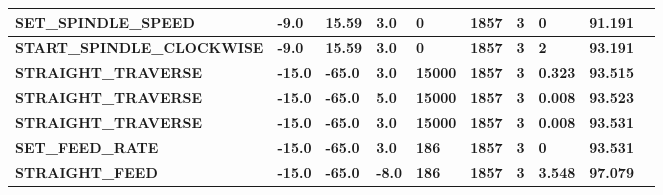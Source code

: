 \documentclass[aspectratio=169]{beamer}
\begin{document}
{\begin{frame}[fragile]
\begin{tabular}{|l|l|l|l|l|l|l|l|l|l|}
    \tiny{\bfseries{SET\_SPINDLE\_SPEED}} & 
    \tiny{\bfseries{-9.0}} & 
    \tiny{\bfseries{15.59}} & 
    \tiny{\bfseries{3.0}} & 
    \tiny{\bfseries{0}} & 
    \tiny{\bfseries{1857}} & 
    \tiny{\bfseries{3}} & 
    \tiny{\bfseries{0}} & 
    \tiny{\bfseries{91.191}} \\
    \hline

    \tiny{\bfseries{START\_SPINDLE\_CLOCKWISE}} & 
    \tiny{\bfseries{-9.0}} & 
    \tiny{\bfseries{15.59}} & 
    \tiny{\bfseries{3.0}} & 
    \tiny{\bfseries{0}} & 
    \tiny{\bfseries{1857}} & 
    \tiny{\bfseries{3}} & 
    \tiny{\bfseries{2}} & 
    \tiny{\bfseries{93.191}} \\
    \hline    

    \tiny{\bfseries{STRAIGHT\_TRAVERSE}} & 
    \tiny{\bfseries{-15.0}} & 
    \tiny{\bfseries{-65.0}} & 
    \tiny{\bfseries{3.0}} & 
    \tiny{\bfseries{15000}} & 
    \tiny{\bfseries{1857}} & 
    \tiny{\bfseries{3}} & 
    \tiny{\bfseries{0.323}} & 
    \tiny{\bfseries{93.515}} \\
    \hline

    \tiny{\bfseries{STRAIGHT\_TRAVERSE}} & 
    \tiny{\bfseries{-15.0}} & 
    \tiny{\bfseries{-65.0}} & 
    \tiny{\bfseries{5.0}} & 
    \tiny{\bfseries{15000}} & 
    \tiny{\bfseries{1857}} & 
    \tiny{\bfseries{3}} & 
    \tiny{\bfseries{0.008}} & 
    \tiny{\bfseries{93.523}} \\
    \hline

    \tiny{\bfseries{STRAIGHT\_TRAVERSE}} & 
    \tiny{\bfseries{-15.0}} & 
    \tiny{\bfseries{-65.0}} & 
    \tiny{\bfseries{3.0}} & 
    \tiny{\bfseries{15000}} & 
    \tiny{\bfseries{1857}} & 
    \tiny{\bfseries{3}} & 
    \tiny{\bfseries{0.008}} & 
    \tiny{\bfseries{93.531}} \\
    \hline

    \tiny{\bfseries{SET\_FEED\_RATE}} & 
    \tiny{\bfseries{-15.0}} & 
    \tiny{\bfseries{-65.0}} & 
    \tiny{\bfseries{3.0}} & 
    \tiny{\bfseries{186}} & 
    \tiny{\bfseries{1857}} & 
    \tiny{\bfseries{3}} & 
    \tiny{\bfseries{0}} & 
    \tiny{\bfseries{93.531}} \\
    \hline

    \tiny{\bfseries{STRAIGHT\_FEED}} & 
    \tiny{\bfseries{-15.0}} & 
    \tiny{\bfseries{-65.0}} & 
    \tiny{\bfseries{-8.0}} & 
    \tiny{\bfseries{186}} & 
    \tiny{\bfseries{1857}} & 
    \tiny{\bfseries{3}} & 
    \tiny{\bfseries{3.548}} & 
    \tiny{\bfseries{97.079}} \\
    \hline    


\end{tabular}
\end{frame}}
\end{document}
